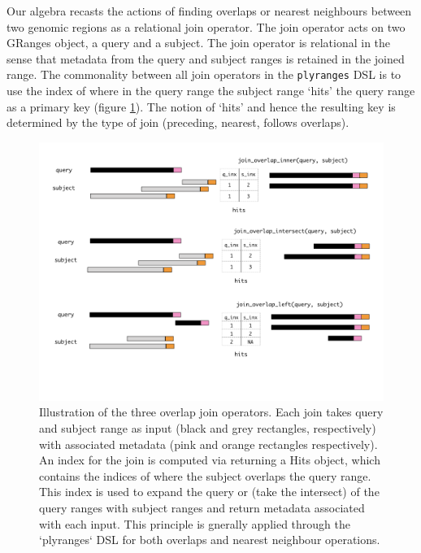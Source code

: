 \documentclass[10pt,letterpaper]{article}
\begin{document}
Our algebra recasts the actions of finding overlaps or nearest
neighbours between two genomic regions as a relational join operator.
The join operator acts on two GRanges object, a query and a subject. The
join operator is relational in the sense that metadata from the query
and subject ranges is retained in the joined range. The commonality
between all join operators in the \texttt{plyranges} DSL is to use the
index of where in the query range the subject range `hits' the query
range as a primary key (figure \ref{fig:olaps-fig}). The notion of
`hits' and hence the resulting key is determined by the type of join
(preceding, nearest, follows overlaps).

\begin{figure}

{\centering \includegraphics[width=400pt]{olaps-figure} 

}

\caption{Illustration of the three overlap join operators. Each join takes query and subject range as input (black and grey rectangles, respectively) with associated metadata (pink and orange rectangles respectively). An index for the join is computed via returning a Hits object, which contains the indices of where the subject overlaps the query range. This index is used to expand the query or (take the intersect) of the query ranges with subject ranges and return metadata associated with each input. This principle is gnerally applied through the `plyranges` DSL for both overlaps and nearest neighbour operations.}\label{fig:olaps-fig}
\end{figure}
\end{document}
